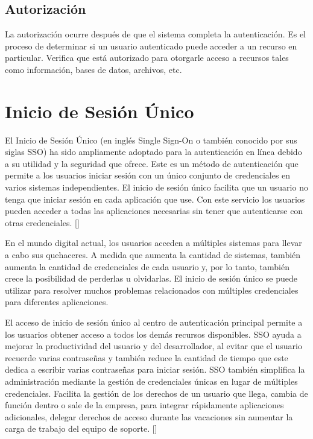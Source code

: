 \subsection{Autorización}
La autorización ocurre después de que el sistema completa la autenticación. Es el proceso de determinar si un usuario autenticado puede acceder a un recurso en particular. Verifica que está autorizado para otorgarle acceso a recursos tales como información, bases de datos, archivos, etc.



\section{Inicio de Sesión Único} \label{sso}
El Inicio de Sesión Único (en inglés Single Sign-On o también conocido por sus siglas SSO) ha sido ampliamente adoptado para la autenticación en línea debido a su utilidad y la seguridad que ofrece. Este es un método de autenticación que permite a los usuarios iniciar sesión con un único conjunto de credenciales en varios sistemas independientes. El inicio de sesión único facilita que un usuario no tenga que iniciar sesión en cada aplicación que use. Con este servicio los usuarios pueden acceder a todas las aplicaciones necesarias sin tener que autenticarse con otras credenciales. [\cite{microsoft-doc}]

En el mundo digital actual, los usuarios acceden a múltiples sistemas para llevar a cabo sus quehaceres. A medida que aumenta la cantidad de sistemas, también aumenta la cantidad de credenciales de cada usuario y, por lo tanto, también crece la posibilidad de perderlas u olvidarlas. El inicio de sesión único se puede utilizar para resolver muchos problemas relacionados con múltiples credenciales para diferentes aplicaciones. 

El acceso de inicio de sesión único al centro de autenticación principal permite a los usuarios obtener acceso a todos los demás recursos disponibles. SSO ayuda a mejorar la productividad del usuario y del desarrollador, al evitar que el usuario recuerde varias contraseñas y también reduce la cantidad de tiempo que este dedica a escribir varias contraseñas para iniciar sesión. SSO también simplifica la administración mediante la gestión de credenciales únicas en lugar de múltiples credenciales. Facilita la gestión de los derechos de un usuario que llega, cambia de función dentro o sale de la empresa, para integrar rápidamente aplicaciones adicionales, delegar derechos de acceso durante las vacaciones sin aumentar la carga de trabajo del equipo de soporte. [\cite{radha2012survey}]

